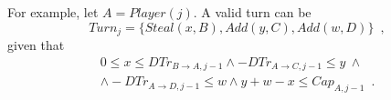 For example, let $A = Player(j)$. A valid turn can be
\begin{equation*}
   Turn_j = \{Steal\left(x, B\right), Add\left(y, C\right), Add\left(w, D\right)\} \enspace,
\end{equation*}
given that
\begin{equation*}
\begin{gathered}
   0 \leq x \leq DTr_{B \rightarrow A, j-1} \wedge -DTr_{A \rightarrow C, j-1} \leq y \: \wedge \\
   \wedge -DTr_{A \rightarrow D, j-1} \leq w \wedge y + w - x \leq Cap_{A, j-1} \enspace.
\end{gathered}
\end{equation*}
